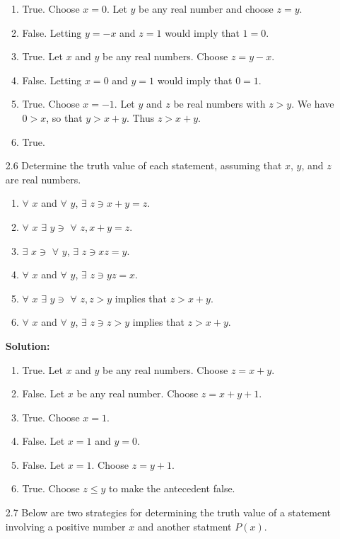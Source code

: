 \begin{enumerate}
      \begin{enumerate}
         \item True. Choose $x = 0$. Let $y$ be any real number and choose
               $z = y$.
         \item False. Letting $y = -x$ and $z = 1$ would imply that $1 = 0$.
         \item True. Let $x$ and $y$ be any real numbers. Choose $z = y - x$.
         \item False. Letting $x = 0$ and $y = 1$ would imply that $0 = 1$.
         \item True. Choose $x = -1$. Let $y$ and $z$ be real numbers with
               $z > y$. We have $0 > x$, so that $y > x + y$. Thus $z > x + y$.
         \item True.
      \end{enumerate}
   \item[2.6] Determine the truth value of each statement, assuming that $x$,
              $y$, and $z$ are real numbers.
      \begin{enumerate}
         \item $\forall$ $x$ and $\forall$ $y$, $\exists$ $z \ni x + y = z$.
         \item $\forall$ $x$ $\exists$ $y \ni$  $\forall$ $z, x + y = z$.
         \item $\exists$ $x \ni$ $\forall$ $y$, $\exists$ $z \ni xz = y$.
         \item $\forall$ $x$ and $\forall$ $y$, $\exists$ $z \ni yz = x$.
         \item $\forall$ $x$ $\exists$ $y \ni$ $\forall$ $z, z > y$ implies that
               $z > x + y$.
         \item $\forall$ $x$ and $\forall$ $y$, $\exists$ $z \ni z > y$ implies
               that $z > x + y$.
      \end{enumerate}

      \textbf{Solution:}

      \begin{enumerate}
         \item True. Let $x$ and $y$ be any real numbers. Choose $z = x + y$.
         \item False. Let $x$ be any real number. Choose $z = x + y + 1$.
         \item True. Choose $x = 1$.
         \item False. Let $x = 1$ and $y = 0$.
         \item False. Let $x = 1$. Choose $z = y + 1$.
         \item True. Choose $z \le y$ to make the antecedent false.
      \end{enumerate}
   \item[2.7] Below are two strategies for determining the truth value of a
              statement involving a positive number $x$ and another statment
              $P(x)$.


\end{enumerate}
